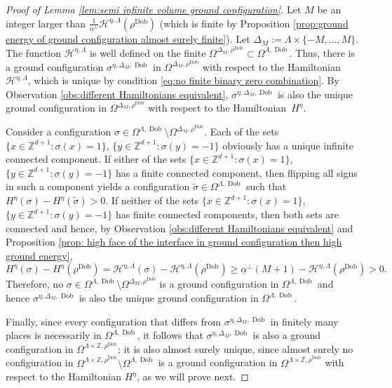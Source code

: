 \documentclass[11pt, reqno]{amsart}
\DeclareMathOperator{\Dob}{Dob}
\numberwithin{equation}{section}
\begin{document}
\begin{proof}[Proof of Lemma \ref{lem:semi infinite volume ground configuration}] 
Let $M$ be an integer larger than $\frac{1}{\underline{\alpha}^{\perp}}\mathcal{H}^{\eta,\Lambda} (\rho^{\Dob})$ (which is finite by Proposition \ref{prop:ground energy of ground configuration almost surely finite}). Let $\Delta_M:=\Lambda \times \{-M,\dots, M\}$.
The function $\mathcal{H}^{\eta,\Lambda}$ is well defined on the finite $\Omega^{\Delta_M,\rho^{\Dob}}\subset\Omega^{\Lambda,\Dob}$.
Thus, there is a ground configuration $\sigma^{\eta,\Delta_M,\Dob}$ in $\Omega^{\Delta_M,\rho^{\Dob}}$ with respect to the Hamiltonian $\mathcal{H}^{\eta,\Lambda}$, which is unique by condition \eqref{eq:no finite binary zero combination}.
By Observation \ref{obs:different Hamiltonians equivalent}, $\sigma^{\eta,\Delta_M,\Dob}$ is also the unique ground configuration in $\Omega^{\Delta_M,\rho^{\Dob}}$ with respect to the Hamiltonian~$H^{\eta}$.

Consider a configuration $\sigma\in\Omega^{\Lambda,\Dob}\setminus\Omega^{\Delta_M,\rho^{\Dob}}$.
Each of the sets $\{x\in{\mathbb Z}^{d+1}\colon \sigma(x)=1\}$, $\{y\in{\mathbb Z}^{d+1}\colon \sigma(y)=-1\}$ obviously has a unique infinite connected component.
If either of the sets $\{x\in{\mathbb Z}^{d+1}\colon \sigma(x)=1\}$, $\{y\in{\mathbb Z}^{d+1}\colon \sigma(y)=-1\}$ has a finite connected component, then 
flipping all signs in such a component yields a configuration $\tilde{\sigma}\in\Omega^{\Lambda,\Dob}$ such that $H^{\eta}(\sigma)- H^{\eta}(\tilde{\sigma}) >0$.
If neither of the sets $\{x\in{\mathbb Z}^{d+1}\colon \sigma(x)=1\}$, $\{y\in{\mathbb Z}^{d+1}\colon \sigma(y)=-1\}$ has finite connected components, then both sets are connected and hence, by Observation \ref{obs:different Hamiltonians equivalent} and Proposition \ref{prop: high face of the interface in ground configuration then high ground energy},
$$H^{\eta}(\sigma)-H^{\eta}(\rho^{\Dob}) =
\mathcal{H}^{\eta,\Lambda}(\sigma)-\mathcal{H}^{\eta, \Lambda}(\rho^{\Dob})\geq \underline{\alpha}^{\perp}(M+1)-\mathcal{H}^{\eta, \Lambda}(\rho^{\Dob})>0.$$
Therefore, no $\sigma\in\Omega^{\Lambda,\Dob}\setminus\Omega^{\Delta_M,\rho^{\Dob}}$ is a ground configuration in $\Omega^{\Lambda,\Dob}$ and hence $\sigma^{\eta,\Delta_M,\Dob}$ is also the unique ground configuration in $\Omega^{\Lambda,\Dob}$.

Finally, since every configuration that differs from 
$\sigma^{\eta,\Delta_M,\Dob}$ in finitely many places is necessarily in $\Omega^{\Lambda,\Dob}$, it follows that $\sigma^{\eta,\Delta_M,\Dob}$ is also a ground configuration in $\Omega^{\Lambda\times{\mathbb Z},\rho^{\Dob}}$; 
it is also almost surely unique, since almost surely no configuration in $\Omega^{\Lambda\times{\mathbb Z},\rho^{\Dob}}\setminus\Omega^{\Lambda,\Dob}$ is a ground configuration in $\Omega^{\Lambda\times{\mathbb Z},\rho^{\Dob}}$ with respect to the Hamiltonian $H^{\eta}$, as we will prove next.


\end{proof}
\end{document}
